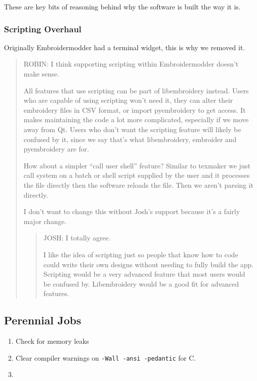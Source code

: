 \documentclass[a4paper, 11pt]{report}
\begin{document}
These are key bits of reasoning behind why the software is built the way
it is.

\hypertarget{scripting-overhaul-1}{%
\subsubsection{Scripting Overhaul}\label{scripting-overhaul-1}}

Originally Embroidermodder had a terminal widget, this is why we removed
it.

\begin{quote}
ROBIN: I think supporting scripting within Embroidermodder doesn't make
sense.

All features that use scripting can be part of libembroidery instead.
Users who are capable of using scripting won't need it, they can alter
their embroidery files in CSV format, or import pyembroidery to get
access. It makes maintaining the code a lot more complicated, especially
if we move away from Qt. Users who don't want the scripting feature will
likely be confused by it, since we say that's what libembroidery,
embroider and pyembroidery are for.

How about a simpler ``call user shell'' feature? Similar to texmaker we
just call system on a batch or shell script supplied by the user and it
processes the file directly then the software reloads the file. Then we
aren't parsing it directly.

I don't want to change this without Josh's support because it's a fairly
major change.

\begin{quote}
JOSH: I totally agree.

I like the idea of scripting just so people that know how to code could
write their own designs without needing to fully build the app.
Scripting would be a very advanced feature that most users would be
confused by. Libembroidery would be a good fit for advanced features.
\end{quote}
\end{quote}

\hypertarget{perennial-jobs-1}{%
\subsection{Perennial Jobs}\label{perennial-jobs-1}}

\begin{enumerate}
\def\labelenumi{\arabic{enumi}.}
\item
  Check for memory leaks
\item
  Clear compiler warnings on \texttt{-Wall\ -ansi\ -pedantic} for C.
\item
\end{enumerate}
\end{document}
